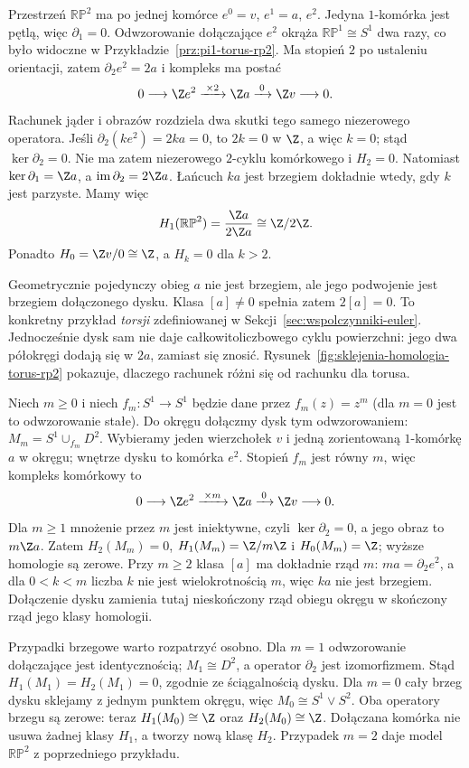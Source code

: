 \begin{przyklad}
\label{prz:homologia-rp2}
Przestrzeń $\mathbb{RP}^2$
ma po jednej komórce
$e^0=v$, $e^1=a$, $e^2$.
Jedyna $1$-komórka jest pętlą,
więc $\partial_1=0$.
Odwzorowanie dołączające $e^2$
okrąża $\mathbb{RP}^1\cong S^1$
dwa razy, co było widoczne
w Przykładzie~\ref{prz:pi1-torus-rp2}.
Ma stopień $2$ po ustaleniu
orientacji, zatem $\partial_2e^2=2a$ i kompleks ma postać
\[
 0\longrightarrow\Z e^2
 \xrightarrow{\;\times2\;}\Z a
 \xrightarrow{\;0\;}\Z v
 \longrightarrow0.
\]
Rachunek jąder i obrazów rozdziela dwa skutki tego samego
niezerowego operatora. Jeśli $\partial_2(ke^2)=2ka=0$,
to $2k=0$ w $\Z$, a więc $k=0$; stąd $\ker\partial_2=0$.
Nie ma zatem niezerowego $2$-cyklu komórkowego i $H_2=0$.
Natomiast $\ker\partial_1=\Z a$, a
$\operatorname{im}\partial_2=2\Z a$.
Łańcuch $ka$ jest brzegiem dokładnie wtedy, gdy $k$ jest parzyste.
Mamy więc
\[
 H_1(\mathbb{RP}^2)
 =\frac{\Z a}{2\Z a}\cong\Z/2\Z.
\]
Ponadto $H_0=\Z v/0\cong\Z$, a $H_k=0$ dla $k>2$.

Geometrycznie pojedynczy obieg $a$ nie jest brzegiem,
ale jego podwojenie jest brzegiem dołączonego dysku.
Klasa $[a]\ne0$ spełnia zatem $2[a]=0$.
To konkretny przykład \emph{torsji} zdefiniowanej w
Sekcji~\ref{sec:wspolczynniki-euler}.
Jednocześnie dysk sam nie daje całkowitoliczbowego cyklu powierzchni:
jego dwa półokręgi dodają się w $2a$, zamiast się znosić.
Rysunek~\ref{fig:sklejenia-homologia-torus-rp2} pokazuje,
dlaczego rachunek różni się od rachunku dla torusa.
\end{przyklad}

\begin{przyklad}
\label{prz:homologia-dolaczenie-stopien-m}
Niech $m\geq0$ i niech $f_m:S^1\to S^1$ będzie dane przez
$f_m(z)=z^m$ (dla $m=0$ jest to odwzorowanie stałe).
Do okręgu dołączmy dysk tym odwzorowaniem:
$M_m=S^1\cup_{f_m}D^2$.
Wybieramy jeden wierzchołek $v$ i jedną zorientowaną
$1$-komórkę $a$ w okręgu; wnętrze dysku to komórka $e^2$.
Stopień $f_m$ jest równy $m$, więc kompleks komórkowy to
\[
 0\longrightarrow\Z e^2
 \xrightarrow{\;\times m\;}\Z a
 \xrightarrow{\;0\;}\Z v\longrightarrow0.
\]
Dla $m\geq1$ mnożenie przez $m$ jest iniektywne,
czyli $\ker\partial_2=0$, a jego obraz to $m\Z a$.
Zatem $H_2(M_m)=0$, $H_1(M_m)=\Z/m\Z$ i $H_0(M_m)=\Z$;
wyższe homologie są zerowe.
Przy $m\geq2$ klasa $[a]$ ma dokładnie rząd $m$:
$ma=\partial_2e^2$, a dla $0<k<m$ liczba $k$ nie jest
wielokrotnością $m$, więc $ka$ nie jest brzegiem.
Dołączenie dysku zamienia tutaj nieskończony rząd obiegu okręgu
w skończony rząd jego klasy homologii.

Przypadki brzegowe warto rozpatrzyć osobno.
Dla $m=1$ odwzorowanie dołączające jest identycznością;
$M_1\cong D^2$, a operator $\partial_2$ jest izomorfizmem.
Stąd $H_1(M_1)=H_2(M_1)=0$, zgodnie ze ściągalnością dysku.
Dla $m=0$ cały brzeg dysku sklejamy z jednym punktem okręgu,
więc $M_0\cong S^1\vee S^2$.
Oba operatory brzegu są zerowe: teraz
$H_1(M_0)\cong\Z$ oraz $H_2(M_0)\cong\Z$.
Dołączana komórka nie usuwa żadnej klasy $H_1$, a tworzy nową klasę $H_2$.
Przypadek $m=2$ daje model $\mathbb{RP}^2$ z poprzedniego przykładu.
\end{przyklad}

